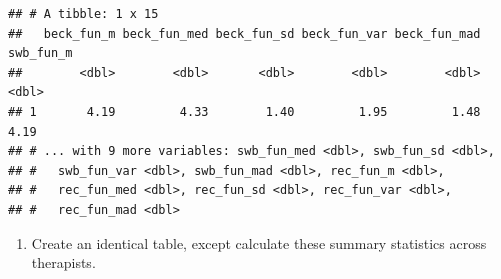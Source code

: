 \documentclass[]{book}
\newenvironment{Shaded}{\begin{snugshade}}{\end{snugshade}}
\newcommand{\NormalTok}[1]{#1}
\providecommand{\tightlist}{%
  \setlength{\itemsep}{0pt}\setlength{\parskip}{0pt}}
\theoremstyle{definition}
\theoremstyle{definition}
\theoremstyle{definition}
\theoremstyle{remark}
\begin{document}
\begin{Shaded}
\begin{Highlighting}[]
{{\NormalTok{summary_stat}
\end{Highlighting}
\end{Shaded}

\begin{verbatim}
## # A tibble: 1 x 15
##   beck_fun_m beck_fun_med beck_fun_sd beck_fun_var beck_fun_mad swb_fun_m
##        <dbl>        <dbl>       <dbl>        <dbl>        <dbl>     <dbl>
## 1       4.19         4.33        1.40         1.95         1.48      4.19
## # ... with 9 more variables: swb_fun_med <dbl>, swb_fun_sd <dbl>,
## #   swb_fun_var <dbl>, swb_fun_mad <dbl>, rec_fun_m <dbl>,
## #   rec_fun_med <dbl>, rec_fun_sd <dbl>, rec_fun_var <dbl>,
## #   rec_fun_mad <dbl>
\end{verbatim}

\begin{enumerate}
\def\labelenumi{\arabic{enumi}.}
\setcounter{enumi}{1}
\tightlist
\item
  Create an identical table, except calculate these summary statistics across therapists.
\end{enumerate}
\end{document}
